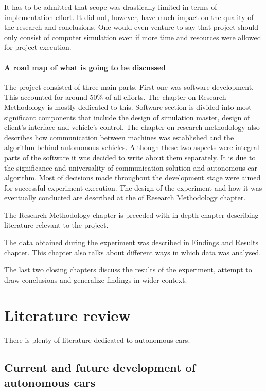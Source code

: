 \documentclass[11pt]{article}
\begin{document}
It has to be admitted that scope was drastically limited in terms of implementation effort. It did not, however, have much impact on the quality of the research and conclusions. One would even venture to say that project should only consist of computer simulation even if more time and resources were allowed for project execution. 

\paragraph{A road map of what is going to be discussed}

The project consisted of three main parts. First one was software development. This accounted for around 50\% of all efforts. The chapter on Research Methodology is mostly dedicated to this. Software section is divided into most significant components that include the design of simulation master, design of client's interface and vehicle's control. The chapter on research methodology also describes how communication between machines was established and the algorithm behind autonomous vehicles. Although these two aspects were integral parts of the software it was decided to write about them separately. It is due to the significance and universality of communication solution and autonomous car algorithm. 
Most of decisions made throughout the development stage were aimed for successful experiment execution. The design of the experiment and how it was eventually conducted are described at the of Research Methodology chapter. 


The Research Methodology chapter is preceded with in-depth chapter describing literature relevant to the project. 

The data obtained during the experiment was described in Findings and Results chapter. This chapter also talks about different ways in which data was analysed. 

The last two closing chapters discuss the results of the experiment, attempt to draw conclusions and generalize findings in wider context. 





\section{Literature review}

There is plenty of literature dedicated to autonomous cars. 


\subsection{Current and future development of autonomous cars}
\end{document}
